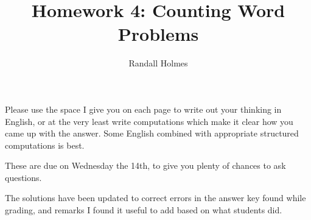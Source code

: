 \documentclass[12pt]{article}
\title{Homework 4:  Counting Word Problems}
\author{Randall Holmes}
\begin{document}
\maketitle

Please use the space I give you on each page to write out your thinking in English, or at the very least write computations which make it clear how you came up with the answer.  Some English combined with appropriate structured computations is best.

These are due on Wednesday the 14th, to give you plenty of chances to ask questions.

The solutions have been updated to correct errors in the answer key found while grading, and remarks I found it useful to add based on what students did.

\newpage
\end{document}
